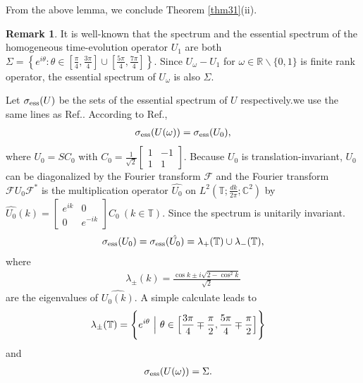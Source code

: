 \documentclass[a4paper,12pt]{article}
\theoremstyle{plain}
\theoremstyle{definition}
\theoremstyle{definition}
\newtheorem{remark}{Remark}
\begin{document}
From the above lemma, we conclude Theorem \ref{thm31}(ii).

\begin{remark}\label{remark3}
It is well-known that the spectrum and the essential spectrum of the homogeneous time-evolution operator $U_1$ are both $\Sigma=\left\{e^{i\theta}:\theta\in\left[\frac{\pi}{4},\frac{3\pi}{4}\right]\cup\left[\frac{5\pi}{4},\frac{7\pi}{4}\right]\right\}$.
Since $U_\omega - U_1$ for $\omega\in {\mathbb R}\backslash\{0,1\}$ is finite rank operator,
the essential spectrum of $U_\omega$ is also $\Sigma$.
\end{remark}
Let $\sigma_{\rm ess}(U)$ be the sets of the essential spectrum of $U$ respectively.we use the same lines as Ref.\cite{Tanaka2021}. According to Ref.\cite{Tanaka2021},
\begin{align*}
    \sigma _{\rm ess}(U(\omega))=\sigma _{\rm{ess}}(U_{0}),
\end{align*}
where $U_{0}=SC_{0}$ with $C_{0}=\frac{1}{\sqrt{2}}\begin{bmatrix}
    1 & -1 \\
    1 & 1
\end{bmatrix}$. Because $U_{0}$ is translation-invariant, $U_{0}$ can be diagonalized by the Fourier transform $\mathcal{F}$ and the Fourier transform $\mathcal{F}U_{0}\mathcal{F}^*$ is the multiplication operator $\hat{U_{0}}$ on $L^2(\mathbb{T};\frac{dk}{2\pi};\mathbb{C}^2)$ by 
$\hat{U_{0}}(k)=\begin{bmatrix}
    e^{ik} & 0 \\
    0 & e^{-ik}
\end{bmatrix}C_{0} ~ (k\in \mathbb{T})$. Since the spectrum is unitarily invariant.
\begin{align*}
\sigma_{\rm ess}(U_{0}) = \sigma_{\rm ess}(\hat{U_{0}}) =\lambda_{+}(\mathbb{T}) \cup \lambda_{-}(\mathbb{T}),
\end{align*}
where
\begin{align*}
    \lambda_{\pm}(k)=\frac{\cos k \pm i\sqrt{2-\cos ^2 k}}{\sqrt{2}}
\end{align*}
are the eigenvalues of $\hat{U_{0}(k)}$. A simple calculate leads to 
\begin{align*}
    \lambda_{\pm}(\mathbb{T})
     &= \Biggl\{ e^{i\theta} ~\Big{|}~ \theta \in \Bigl[\frac{3\pi}{4} \mp \frac{\pi}{2},\frac{5\pi}{4} \mp \frac{\pi}{2}\Bigr] \Biggr\}
\end{align*}
and
\begin{align*}
    \sigma _{\rm{ess}}(U(\omega))
     &= \Sigma .
\end{align*}
\fi
\end{document}

